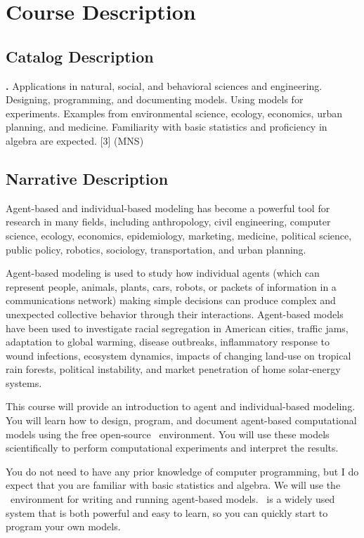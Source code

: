 \documentclass[11pt,twoside]{jgsyllabus}\usepackage[]{graphicx}\usepackage[]{color}
\begin{document}
\medskip
\section[Description]{Course Description}
\subsection{Catalog Description}
\textbf{\ShortCourseName.} Applications in natural, social, and behavioral
sciences and engineering. Designing, programming, and documenting models.
Using models for experiments. Examples from environmental science, ecology,
economics, urban planning, and medicine. Familiarity with basic statistics and
proficiency in algebra are expected.
[3] (MNS)

\subsection{Narrative Description}
Agent-based and individual-based modeling has become a powerful tool for
research in many fields, including anthropology, civil engineering,
computer science, ecology, economics, epidemiology, marketing, medicine,
political science, public policy, robotics, sociology, transportation, and
urban planning.

Agent-based modeling is used to study how individual agents (which can represent
people, animals, plants, cars, robots, or packets of information in a
communications network) making simple decisions can produce complex and
unexpected collective behavior through their interactions. Agent-based models
have been used to investigate racial segregation in American cities, traffic
jams, adaptation to global warming, disease outbreaks, inflammatory response to
wound infections, ecosystem dynamics, impacts of changing land-use on tropical
rain forests, political instability, and market penetration of home solar-energy
systems.

This course will provide an introduction to agent and individual-based modeling.
You will learn how to design, program, and document agent-based computational
models using the free open-source \NetLogo\ environment. You will use these
models scientifically to perform computational experiments and interpret the
results.

You do not need to have any prior knowledge of computer programming, but I do
expect that you are familiar with basic statistics and algebra.
We will use the \NetLogo\ environment for writing and running agent-based models.
\NetLogo\ is a widely used system that is both powerful and easy to learn, so
you can quickly start to program your own models.
\end{document}
